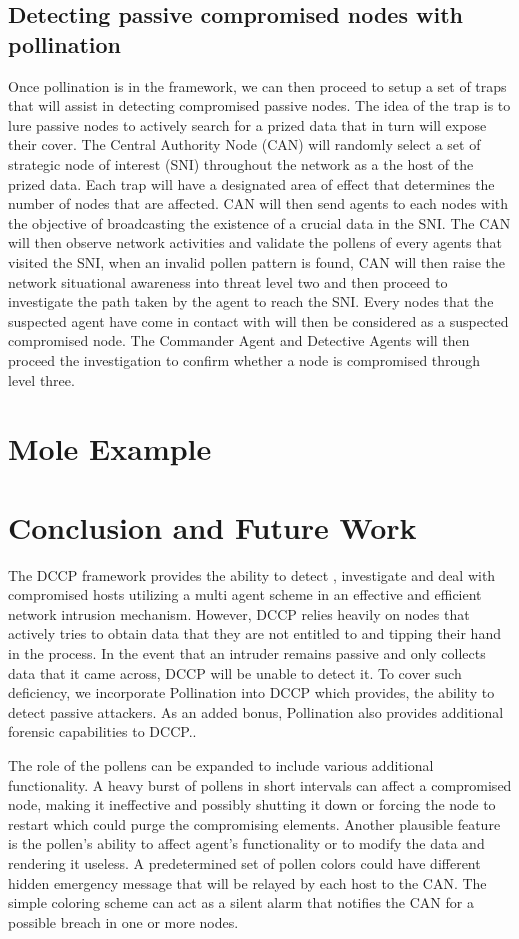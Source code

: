 \documentclass{acm_proc_article-sp}
\begin{document}
\subsection{Detecting passive compromised nodes with pollination}
Once pollination is in the framework, we can then proceed to setup a set of traps that will assist in detecting compromised passive nodes. The idea of the trap is to lure passive nodes to actively search for a  prized data that in turn will expose their cover. The Central Authority Node (CAN) will randomly select a set of strategic node of interest (SNI) throughout the network as a the host of the prized data. Each trap will have a designated area of effect that determines the number of nodes that are affected. CAN will then send agents to each nodes with the objective of broadcasting the existence of a crucial data in the SNI. The CAN will then observe network activities and validate the pollens of every agents that visited the SNI, when an invalid pollen pattern is found, CAN will then raise the network situational awareness into threat level two and then proceed to investigate the path taken by the agent to reach the SNI. Every nodes that the suspected agent have come in contact with will then be considered as a suspected compromised node. The Commander Agent and Detective Agents will then proceed the investigation to confirm whether a node is compromised through level three. 

\section{Mole Example}

\section{Conclusion and Future Work}
The DCCP framework provides the ability to detect , investigate and deal with compromised hosts utilizing a multi agent scheme in an effective and efficient network intrusion mechanism.  However, DCCP relies heavily on nodes that actively tries to obtain data that they are not entitled to and tipping their hand in the process. In the event that an intruder remains passive and only collects data that it came across, DCCP will be unable to detect it. To cover such deficiency, we incorporate Pollination into DCCP which provides, the ability to detect passive attackers. As an added bonus, Pollination also provides additional forensic capabilities to DCCP..

The role of the pollens can be expanded to include various additional functionality. A heavy burst of pollens in short intervals can affect a compromised node, making it ineffective and possibly shutting it down or forcing the node to restart which could purge the compromising elements. Another plausible feature is the pollen's ability to affect agent's functionality or to modify the data and rendering it useless. A predetermined set of pollen colors could have different hidden emergency message that will be relayed by each host to the CAN. The simple coloring scheme can act as a silent alarm that notifies the CAN for a possible breach in one or more nodes.
\cite{asdf}
\end{document}
